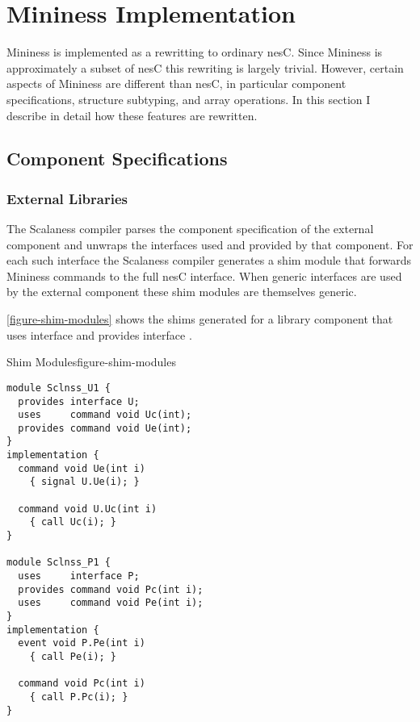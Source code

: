 \chapter{Mininess Implementation}
\label{chap:mininess-implementation}

Mininess is implemented as a rewritting to ordinary nesC. Since Mininess is approximately a
subset of nesC this rewriting is largely trivial. However, certain aspects of Mininess are
different than nesC, in particular component specifications, structure subtyping, and array
operations. In this section I describe in detail how these features are rewritten.

\section{Component Specifications}
\label{sec:component-specifications-implementation}


\subsection{External Libraries}
\label{sec:external-libraries-implementation}

 The Scalaness compiler parses the component
specification of the external component and unwraps the interfaces used and provided by that
component. For each such interface the Scalaness compiler generates a shim module that forwards
Mininess commands to the full nesC interface. When generic interfaces are used by the external
component these shim modules are themselves generic.

\autoref{figure-shim-modules} shows the shims generated for a library component
 that uses interface  and provides interface .

\singlespace
\begin{fpfig}[tbhp]{Shim Modules}{figure-shim-modules}
{
\begin{Verbatim}[fontsize=\small]
module Sclnss_U1 {
  provides interface U;
  uses     command void Uc(int);
  provides command void Ue(int);
}
implementation {
  command void Ue(int i)
    { signal U.Ue(i); }

  command void U.Uc(int i)
    { call Uc(i); }
}

module Sclnss_P1 {
  uses     interface P;
  provides command void Pc(int i);
  uses     command void Pe(int i);
}
implementation {
  event void P.Pe(int i)
    { call Pe(i); }

  command void Pc(int i)
    { call P.Pc(i); }
}
\end{Verbatim}
}
\end{fpfig}
\primaryspacing

